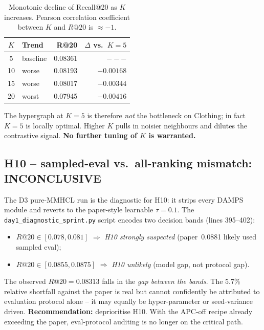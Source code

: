 \documentclass[11pt,a4paper]{article}
\begin{document}
\begin{table}[h]
\centering
\renewcommand{\arraystretch}{1.2}
\begin{tabularx}{0.7\textwidth}{|c|X|r|r|}
\hline
$K$ & Trend  & R@20 & $\Delta$ vs.\ $K=5$ \\
\hline
5   & baseline & 0.08361 & $---$ \\
\hline
10  & worse & 0.08193 & $-0.00168$ \\
\hline
15  & worse & 0.08017 & $-0.00344$ \\
\hline
20  & worst & 0.07945 & $-0.00416$ \\
\hline
\end{tabularx}
\caption{Monotonic decline of Recall@20 as $K$ increases. Pearson
correlation coefficient between $K$ and $R@20$ is $\approx -1$.}
\label{tab:topk}
\end{table}

The hypergraph at \(K=5\) is therefore \emph{not} the bottleneck on
Clothing; in fact \(K=5\) is locally optimal. Higher $K$ pulls in noisier
neighbours and dilutes the contrastive signal. \textbf{No further tuning
of \(K\) is warranted.}

\subsection{H10 -- sampled-eval vs.\ all-ranking mismatch: \textbf{INCONCLUSIVE}}

The D3 pure-MMHCL run is the diagnostic for H10: it strips every DAMPS
module and reverts to the paper-style learnable $\tau=0.1$. The
\texttt{day1\_diagnostic\_sprint.py} script encodes two decision bands
(lines 395--402):

\begin{itemize}[leftmargin=*]
\item $R@20 \in [0.078, 0.081]$ $\Rightarrow$ \emph{H10 strongly suspected}
      (paper~0.0881 likely used sampled eval);
\item $R@20 \in [0.0855, 0.0875]$ $\Rightarrow$ \emph{H10 unlikely}
      (model gap, not protocol gap).
\end{itemize}

The observed \(R@20 = 0.08313\) falls in the \emph{gap between the bands}.
The 5.7\% relative shortfall against the paper is real but cannot
confidently be attributed to evaluation protocol alone -- it may equally
be hyper-parameter or seed-variance driven.
\textbf{Recommendation:} deprioritise H10. With the APC-off recipe
already exceeding the paper, eval-protocol auditing is no longer on the
critical path.
\end{document}
